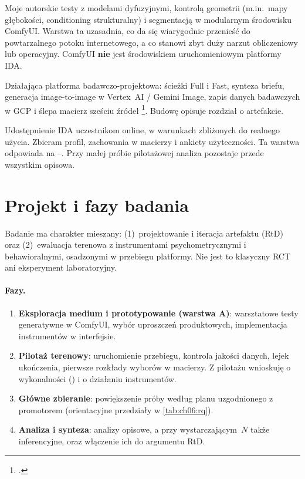 \begin{description}[style=nextline]
  \item[(A) Eksploracja warsztatowa medium dyfuzyjnego (ComfyUI)]
  Moje autorskie testy z modelami dyfuzyjnymi, kontrolą geometrii (m.in.\ mapy głębokości, conditioning strukturalny) i segmentacją w modularnym środowisku ComfyUI. Warstwa ta uzasadnia, co da się wiarygodnie przenieść do powtarzalnego potoku internetowego, a co stanowi zbyt duży narzut obliczeniowy lub operacyjny. ComfyUI \textbf{nie} jest środowiskiem uruchomieniowym platformy IDA.

  \item[(B) Artefakt IDA]
  Działająca platforma badawczo-projektowa: ścieżki Full i Fast, synteza briefu, generacja image-to-image w Vertex~AI / Gemini Image, zapis danych badawczych w GCP i ślepa macierz sześciu źródeł \footcite{idaPlatform2026}. Budowę opisuje rozdział o artefakcie.

  \item[(C) Ewaluacja terenowa]
  Udostępnienie IDA uczestnikom online, w warunkach zbliżonych do realnego użycia. Zbieram profil, zachowania w macierzy i ankiety użyteczności. Ta warstwa odpowiada na --. Przy małej próbie pilotażowej analiza pozostaje przede wszystkim opisowa.
\end{description}

\section{Projekt i fazy badania}
\label{ch06:sec:projekt}

Badanie ma charakter mieszany: (1)~projektowanie i iteracja artefaktu (RtD) oraz (2)~ewaluacja terenowa z instrumentami psychometrycznymi i behawioralnymi, osadzonymi w przebiegu platformy. Nie jest to klasyczny RCT ani eksperyment laboratoryjny.

\paragraph{Fazy.}
\begin{enumerate}
  \item \textbf{Eksploracja medium i prototypowanie (warstwa A)}: warsztatowe testy generatywne w ComfyUI, wybór uproszczeń produktowych, implementacja instrumentów w interfejsie.
  \item \textbf{Pilotaż terenowy}: uruchomienie przebiegu, kontrola jakości danych, lejek ukończenia, pierwsze rozkłady wyborów w macierzy. Z pilotażu wnioskuję o wykonalności () i o działaniu instrumentów.
  \item \textbf{Główne zbieranie}: powiększenie próby według planu uzgodnionego z promotorem (orientacyjne przedziały w \cref{tab:ch06:rq}).
  \item \textbf{Analiza i synteza}: analizy opisowe, a przy wystarczającym~$N$ także inferencyjne, oraz włączenie ich do argumentu RtD.
\end{enumerate}

